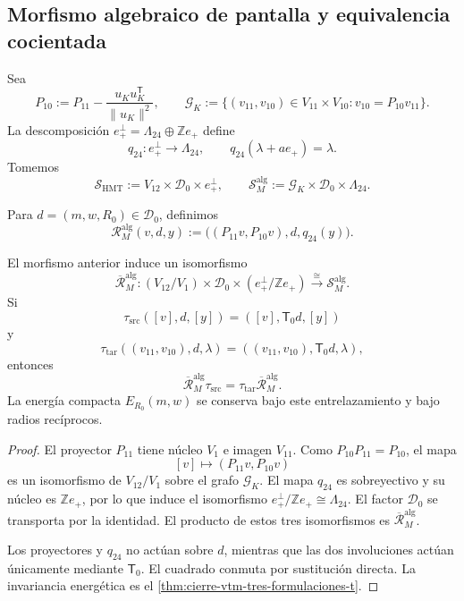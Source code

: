 \subsection{Morfismo algebraico de pantalla y equivalencia cocientada}

Sea
\[
 P_{10}:=P_{11}-\frac{u_Ku_K^{\mathsf T}}{\lVert u_K\rVert^2},
 \qquad
 \mathscr G_K:=
 \{(v_{11},v_{10})\in V_{11}\times V_{10}:
             v_{10}=P_{10}v_{11}\}.
\]
La descomposición
\(e_+^\perp=\Lambda_{24}\oplus\mathbb Ze_+\) define
\[
 q_{24}:e_+^\perp\longrightarrow\Lambda_{24},
 \qquad q_{24}(\lambda+ae_+)=\lambda.
\]
Tomemos
\[
 \mathscr S_{\mathrm{HMT}}
 :=V_{12}\times\mathscr D_0\times e_+^\perp,
 \qquad
 \mathscr S_M^{\mathrm{alg}}
 :=\mathscr G_K\times\mathscr D_0\times\Lambda_{24}.
\]

\begin{definition}
\label{def:cierre-vtm-rm-algebraico}
Para \(d=(m,w,R_0)\in\mathscr D_0\), definimos
\[
 \boxed{
 \mathcal R_M^{\mathrm{alg}}(v,d,y)
 :=\bigl((P_{11}v,P_{10}v),d,q_{24}(y)\bigr).}
\]
\end{definition}

\begin{theorem}
\label{thm:cierre-vtm-rm-algebraico}
El morfismo anterior induce un isomorfismo
\[
 \boxed{
 \overline{\mathcal R}_M^{\mathrm{alg}}:
 (V_{12}/V_1)\times\mathscr D_0
 \times(e_+^\perp/\mathbb Ze_+)
 \xrightarrow{\ \cong\ }
 \mathscr S_M^{\mathrm{alg}}.}
\]
Si
\[
 \tau_{\mathrm{src}}([v],d,[y])
 =([v],\mathsf T_0d,[y])
\]
y
\[
 \tau_{\mathrm{tar}}((v_{11},v_{10}),d,\lambda)
 =((v_{11},v_{10}),\mathsf T_0d,\lambda),
\]
entonces
\[
 \overline{\mathcal R}_M^{\mathrm{alg}}\tau_{\mathrm{src}}
 =\tau_{\mathrm{tar}}\overline{\mathcal R}_M^{\mathrm{alg}}.
\]
La energía compacta \(E_{R_0}(m,w)\) se conserva bajo este
entrelazamiento y bajo radios recíprocos.
\end{theorem}

\begin{proof}
El proyector \(P_{11}\) tiene núcleo \(V_1\) e imagen \(V_{11}\). Como
\(P_{10}P_{11}=P_{10}\), el mapa
\[
 [v]\longmapsto(P_{11}v,P_{10}v)
\]
es un isomorfismo de \(V_{12}/V_1\) sobre el grafo
\(\mathscr G_K\). El mapa \(q_{24}\) es sobreyectivo y su núcleo es
\(\mathbb Ze_+\), por lo que induce el isomorfismo
\(e_+^\perp/\mathbb Ze_+\cong\Lambda_{24}\). El factor
\(\mathscr D_0\) se transporta por la identidad. El producto de estos tres
isomorfismos es \(\overline{\mathcal R}_M^{\mathrm{alg}}\).

Los proyectores y \(q_{24}\) no actúan sobre \(d\), mientras que las dos
involuciones actúan únicamente mediante \(\mathsf T_0\). El cuadrado conmuta
por sustitución directa. La invariancia energética es el
\cref{thm:cierre-vtm-tres-formulaciones-t}.
\end{proof}

